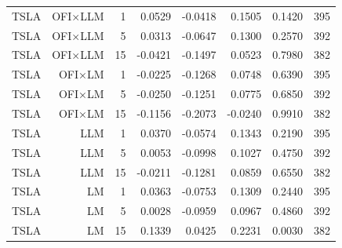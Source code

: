 \begin{table}[htbp]
\begin{tabular}{lrrrrrrr}
TSLA & OFI×LLM & 1 & 0.0529 & -0.0418 & 0.1505 & 0.1420 & 395 \\
TSLA & OFI×LLM & 5 & 0.0313 & -0.0647 & 0.1300 & 0.2570 & 392 \\
TSLA & OFI×LLM & 15 & -0.0421 & -0.1497 & 0.0523 & 0.7980 & 382 \\
TSLA & OFI×LM & 1 & -0.0225 & -0.1268 & 0.0748 & 0.6390 & 395 \\
TSLA & OFI×LM & 5 & -0.0250 & -0.1251 & 0.0775 & 0.6850 & 392 \\
TSLA & OFI×LM & 15 & -0.1156 & -0.2073 & -0.0240 & 0.9910 & 382 \\
TSLA & LLM & 1 & 0.0370 & -0.0574 & 0.1343 & 0.2190 & 395 \\
TSLA & LLM & 5 & 0.0053 & -0.0998 & 0.1027 & 0.4750 & 392 \\
TSLA & LLM & 15 & -0.0211 & -0.1281 & 0.0859 & 0.6550 & 382 \\
TSLA & LM & 1 & 0.0363 & -0.0753 & 0.1309 & 0.2440 & 395 \\
TSLA & LM & 5 & 0.0028 & -0.0959 & 0.0967 & 0.4860 & 392 \\
TSLA & LM & 15 & 0.1339 & 0.0425 & 0.2231 & 0.0030 & 382 \\
\bottomrule
\end{tabular}
\end{table}

